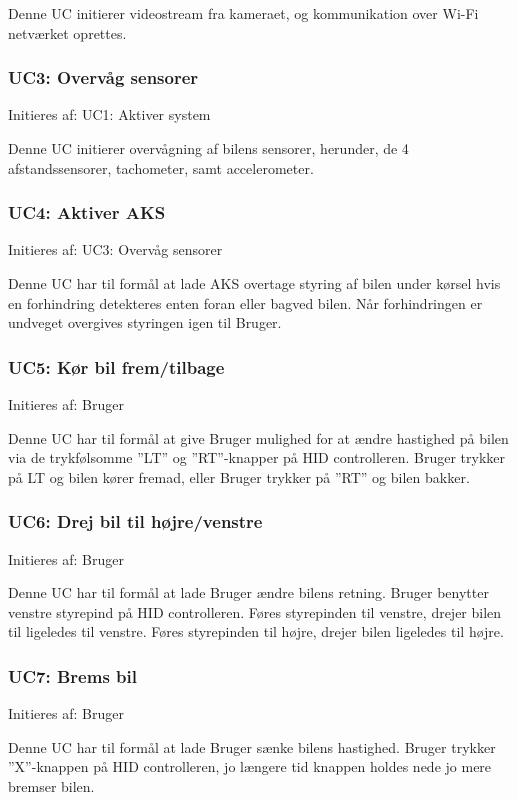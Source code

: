 Denne UC initierer videostream fra kameraet, og kommunikation over Wi-Fi netværket oprettes.

\subsubsection{UC3: Overvåg sensorer}
Initieres af: UC1: Aktiver system

Denne UC initierer overvågning af bilens sensorer, herunder, de 4 afstandssensorer, tachometer, samt accelerometer. 

\subsubsection{UC4: Aktiver AKS}
Initieres af: UC3: Overvåg sensorer

Denne UC har til formål at lade AKS overtage styring af bilen under kørsel hvis en forhindring detekteres enten foran eller bagved bilen.
Når forhindringen er undveget overgives styringen igen til Bruger.

\subsubsection{UC5: Kør bil frem/tilbage}
Initieres af: Bruger

Denne UC har til formål at give Bruger mulighed for at ændre hastighed på bilen via  de trykfølsomme ''LT'' og ''RT''-knapper på HID controlleren. Bruger trykker på LT og bilen kører fremad, eller Bruger trykker på ''RT'' og bilen bakker.

\subsubsection{UC6: Drej bil til højre/venstre}
Initieres af: Bruger

Denne UC har til formål at lade Bruger ændre bilens retning. Bruger benytter venstre styrepind på HID controlleren. Føres styrepinden til venstre, drejer bilen til ligeledes til venstre. Føres styrepinden til højre, drejer bilen ligeledes til højre. 

\subsubsection{UC7: Brems bil}
Initieres af: Bruger

Denne UC har til formål at lade Bruger sænke bilens hastighed. Bruger trykker ''X''-knappen på HID controlleren, jo længere tid knappen holdes nede jo mere bremser bilen. 

